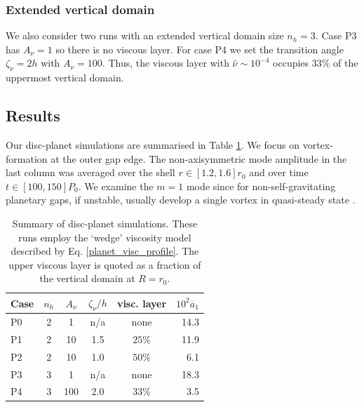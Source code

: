 \subsubsection{Extended vertical domain}
We also consider two runs with an extended vertical domain size
$n_h=3$. Case P3 has $A_\nu=1$ so there is no viscous layer. For case
P4 we set the transition angle $\zeta_\nu=2h$ with $A_\nu=100$. 
Thus, the viscous layer with $\hat{\nu}\sim10^{-4}$ occupies $33\%$ of
the uppermost vertical domain. %




\subsection{Results}
Our disc-planet simulations are summarised in Table \ref{planet_sims}.
We focus on vortex-formation at the outer gap edge. 
The non-axisymmetric mode amplitude in the last column was 
averaged over the shell $r\in[1.2,1.6]r_0$ and over time 
$t\in[100,150]P_0$. We examine the $m=1$ mode since 
for non-self-gravitating planetary gaps, if unstable, usually develop
a single vortex in quasi-steady state \citep{valborro07,lin10}.   


\begin{table}
  \centering
  \caption{Summary of disc-planet simulations. These runs employ the
    `wedge' viscosity model described by
    Eq. \ref{planet_visc_profile}. The upper viscous layer is
    quoted as a fraction of the vertical domain at 
    $R=r_0$. \label{planet_sims}}  
    \begin{tabular}{lccccr}
      \hline\hline
      Case & $n_h$ & $A_\nu$ &$\zeta_\nu/h$ & visc. layer& $10^2\overline{a}_1$ \\ 
      \hline
      P0 &  2     &    1    &    n/a      & none     &   14.3    \\%
      P1 &  2     &    10   &    1.5      & $25\%$  &    11.9     \\ 
      P2 &  2     &    10   &    1.0      & $50\%$  &    6.1      \\
      P3 &  3     &    1    &     n/a      & none  &     18.3   \\
      P4 &  3     &    100   &    2.0      & $33\%$ &     3.5    \\
      \hline
  \end{tabular}
\end{table}

